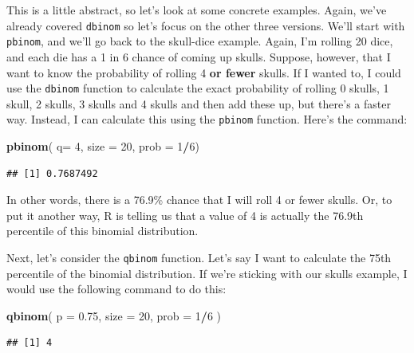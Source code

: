 \documentclass[
]{book}
\newenvironment{Shaded}{\begin{snugshade}}{\end{snugshade}}
\newcommand{\DataTypeTok}[1]{\textcolor[rgb]{0.13,0.29,0.53}{#1}}
\newcommand{\DecValTok}[1]{\textcolor[rgb]{0.00,0.00,0.81}{#1}}
\newcommand{\FloatTok}[1]{\textcolor[rgb]{0.00,0.00,0.81}{#1}}
\newcommand{\KeywordTok}[1]{\textcolor[rgb]{0.13,0.29,0.53}{\textbf{#1}}}
\newcommand{\NormalTok}[1]{#1}
\newcommand{\OperatorTok}[1]{\textcolor[rgb]{0.81,0.36,0.00}{\textbf{#1}}}
\begin{document}
This is a little abstract, so let's look at some concrete examples. Again, we've already covered \texttt{dbinom} so let's focus on the other three versions. We'll start with \texttt{pbinom}, and we'll go back to the skull-dice example. Again, I'm rolling 20 dice, and each die has a 1 in 6 chance of coming up skulls. Suppose, however, that I want to know the probability of rolling 4 \textbf{or fewer} skulls. If I wanted to, I could use the \texttt{dbinom} function to calculate the exact probability of rolling 0 skulls, 1 skull, 2 skulls, 3 skulls and 4 skulls and then add these up, but there's a faster way. Instead, I can calculate this using the \texttt{pbinom} function. Here's the command:

\begin{Shaded}
\begin{Highlighting}[]
\KeywordTok{pbinom}\NormalTok{( }\DataTypeTok{q=} \DecValTok{4}\NormalTok{, }\DataTypeTok{size =} \DecValTok{20}\NormalTok{, }\DataTypeTok{prob =} \DecValTok{1}\OperatorTok{/}\DecValTok{6}\NormalTok{)}
\end{Highlighting}
\end{Shaded}

\begin{verbatim}
## [1] 0.7687492
\end{verbatim}

In other words, there is a 76.9\% chance that I will roll 4 or fewer skulls. Or, to put it another way, R is telling us that a value of 4 is actually the 76.9th percentile of this binomial distribution.

Next, let's consider the \texttt{qbinom} function. Let's say I want to calculate the 75th percentile of the binomial distribution. If we're sticking with our skulls example, I would use the following command to do this:

\begin{Shaded}
\begin{Highlighting}[]
\KeywordTok{qbinom}\NormalTok{( }\DataTypeTok{p =} \FloatTok{0.75}\NormalTok{, }\DataTypeTok{size =} \DecValTok{20}\NormalTok{, }\DataTypeTok{prob =} \DecValTok{1}\OperatorTok{/}\DecValTok{6}\NormalTok{ )}
\end{Highlighting}
\end{Shaded}

\begin{verbatim}
## [1] 4
\end{verbatim}
\end{document}
